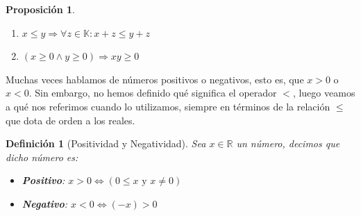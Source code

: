 \documentclass[10pt,a4paper,openright]{book}
\theoremstyle{break}
\newtheorem{defi}{Definición}[chapter]
\newtheorem{prop}{Proposición}[chapter]
\begin{document}
\begin{prop}
\begin{enumerate}
\item $x\leq y \Rightarrow \forall z \in \mathbb{K} : x+z\leq y+z$
\item $(x\geq 0 \wedge y \geq 0)\Rightarrow xy\geq 0$
\end{enumerate}
\end{prop}

Muchas veces hablamos de números positivos o negativos, esto es, que $x > 0$ o $x < 0$. Sin embargo, no hemos definido qué significa el operador $<$, luego veamos a qué nos referimos cuando lo utilizamos, siempre en términos de la relación $\leq$ que dota de orden a los reales.

\begin{defi}[Positividad y Negatividad]
Sea $x\in \mathbb{R}$ un número, decimos que dicho número es:
\begin{itemize}
\item \textbf{Positivo}: $ x> 0 \Leftrightarrow (0\leq x \mbox{ y } x\neq 0)$
\item \textbf{Negativo}: $ x < 0 \Leftrightarrow (-x)>0$
\end{itemize}
\end{defi}
\end{document}
